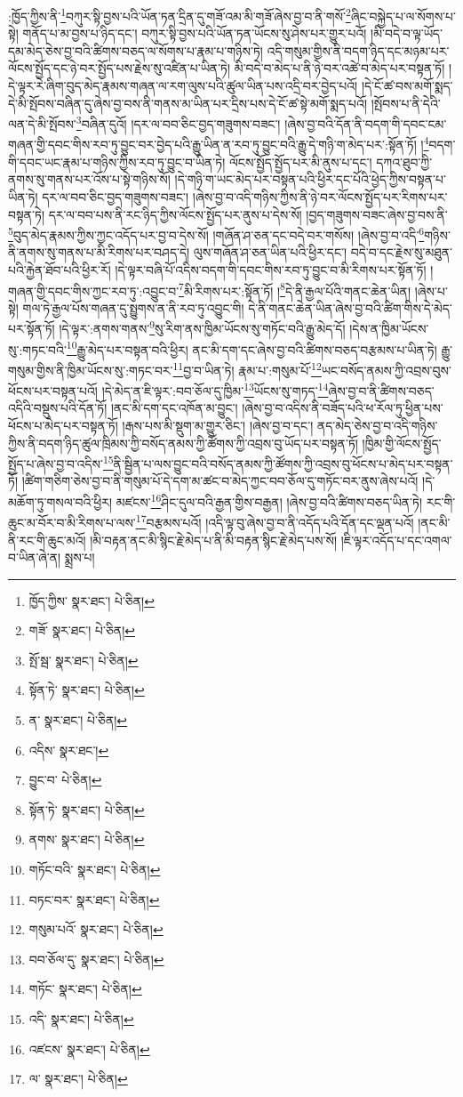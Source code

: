 :ཁྱོད་ཀྱིས་ནི་\footnote{ཁྱོད་ཀྱིས་  སྣར་ཐང་།  པེ་ཅིན། }བཀུར་སྟི་བྱས་པའི་ཡོན་ཏན་དྲིན་དུ་གཟོ་འམ་མི་གཟོ་ཞེས་བྱ་བ་ནི་གསོ་\footnote{གཟོ་  སྣར་ཐང་།  པེ་ཅིན། }ཞིང་བསྐྱེད་པ་ལ་སོགས་པ་སྟེ། གནོད་པ་མ་བྱས་པ་ཉིད་དང་། བཀུར་སྟི་བྱས་པའི་ཡོན་ཏན་ཡོངས་སུ་ཤེས་པར་གྱུར་པའོ། །མི་བདེ་བ་ལྟ་ཡོད་དམ་མེད་ཅེས་བྱ་བའི་ཚིགས་བཅད་ལ་སོགས་པ་རྣམ་པ་གཉིས་ཏེ། འདི་གསུམ་གྱིས་ནི་བདག་ཉིད་དང་མཉམ་པར་ལོངས་སྤྱོད་དང་ཉེ་བར་སྤྱོད་པས་རྗེས་སུ་འཛིན་པ་ཡིན་ཏེ། མི་བདེ་བ་མེད་པ་ནི་ཉེ་བར་འཚེ་བ་མེད་པར་བསྟན་ཏོ། །དེ་ལྟར་རེ་ཞིག་བུད་མེད་རྣམས་གཞན་ལ་རག་ལུས་པའི་ཚུལ་ཡིན་པས་འདྲི་བར་བྱེད་པའོ། །དེ་ངོ་ཚ་བས་མགོ་སྨད་དེ་མི་སྤོབས་བཞིན་དུ་ཞེས་བྱ་བས་ནི་གནས་མ་ཡིན་པར་དྲིས་པས་དེ་ངོ་ཚ་སྟེ་མགོ་སྨད་པའོ། །སྤོབས་པ་ནི་དེའི་ལན་དེ་མི་སྤོབས་\footnote{སྤོ་སྦ་  སྣར་ཐང་།  པེ་ཅིན། }བཞིན་དུའོ། །དར་ལ་བབ་ཅིང་བྱད་གཟུགས་བཟང་། །ཞེས་བྱ་བའི་དོན་ནི་བདག་གི་དབང་ངམ་གཞན་གྱི་དབང་གིས་རབ་ཏུ་བྱུང་བར་བྱེད་པའི་རྒྱུ་ཡིན་ན་རབ་ཏུ་བྱུང་བའི་རྒྱུ་དེ་གཉི་ག་མེད་པར་:སྟོན་ཏོ། །\footnote{སྟོན་ཏེ་  སྣར་ཐང་།  པེ་ཅིན། }བདག་གི་དབང་ཡང་རྣམ་པ་གཉིས་ཀྱིས་རབ་ཏུ་བྱུང་བ་ཡིན་ཏེ། ལོངས་སྤྱོད་སྤྱོད་པར་མི་ནུས་པ་དང་། དཀའ་ཐུབ་ཀྱི་ནགས་སུ་གནས་པར་འོས་པ་སྟེ་གཉིས་སོ། །དེ་གཉི་ག་ཡང་མེད་པར་བསྟན་པའི་ཕྱིར་དང་པོའི་ཕྱེད་ཀྱིས་བསྟན་པ་ཡིན་ཏེ། དར་ལ་བབ་ཅིང་བྱད་གཟུགས་བཟང་། །ཞེས་བྱ་བ་འདི་གཉིས་ཀྱིས་ནི་ཉེ་བར་ལོངས་སྤྱོད་པར་རིགས་པར་བསྟན་ཏེ། དར་ལ་བབ་པས་ནི་རང་ཉིད་ཀྱིས་ལོངས་སྤྱོད་པར་ནུས་པ་དེས་སོ། །བྱད་གཟུགས་བཟང་ཞེས་བྱ་བས་ནི་\footnote{ན་  སྣར་ཐང་།  པེ་ཅིན། }བུད་མེད་རྣམས་ཀྱིས་ཀྱང་འདོད་པར་བྱ་བ་དེས་སོ། །གཞོན་ཤ་ཅན་དང་བདེ་བར་གསོས། །ཞེས་བྱ་བ་འདི་\footnote{འདིས་  སྣར་ཐང་། }གཉིས་ནི་ནགས་སུ་གནས་པ་མི་རིགས་པར་བཤད་དེ། ལུས་གཞོན་ཤ་ཅན་ཡིན་པའི་ཕྱིར་དང་། བདེ་བ་དང་རྗེས་སུ་མཐུན་པའི་རྐྱེན་ཐོབ་པའི་ཕྱིར་རོ། །དེ་ལྟར་བཞི་པོ་འདིས་བདག་གི་དབང་གིས་རབ་ཏུ་བྱུང་བ་མི་རིགས་པར་སྟོན་ཏོ། །གཞན་གྱི་དབང་གིས་ཀྱང་རབ་ཏུ་:འབྱུང་བ་\footnote{བྱུང་བ་  པེ་ཅིན། }མི་རིགས་པར་:སྟོན་ཏོ། །\footnote{སྟོན་ཏེ་  སྣར་ཐང་།  པེ་ཅིན། }དེ་ནི་རྒྱལ་པོའི་གནང་ཆེན་ཡིན། །ཞེས་པ་སྟེ། གལ་ཏེ་རྒྱལ་པོས་གཞན་དུ་སྤྱུགས་ན་ནི་རབ་ཏུ་འབྱུང་གི། དེ་ནི་གནང་ཆེན་ཡིན་ཞེས་བྱ་བའི་ཚིག་གིས་དེ་མེད་པར་སྟོན་ཏོ། །དེ་ལྟར་:ནགས་གནས་\footnote{ནགས་  སྣར་ཐང་།  པེ་ཅིན། }སུ་རིག་ནས་ཁྱིམ་ཡོངས་སུ་གཏོང་བའི་རྒྱུ་མེད་དོ། །དེས་ན་ཁྱིམ་ཡོངས་སུ་:གཏང་བའི་\footnote{གཏོང་བའི་  སྣར་ཐང་།  པེ་ཅིན། }རྒྱུ་མེད་པར་བསྟན་བའི་ཕྱིར། ནང་མི་དག་དང་ཞེས་བྱ་བའི་ཚིགས་བཅད་བརྩམས་པ་ཡིན་ཏེ། རྒྱུ་གསུམ་གྱིས་ནི་ཁྱིམ་ཡོངས་སུ་:གཏང་བར་\footnote{བཏང་བར་  སྣར་ཐང་།  པེ་ཅིན། }བྱ་བ་ཡིན་ཏེ། རྣམ་པ་:གསུམ་པོ་\footnote{གསུམ་པའོ་  སྣར་ཐང་།  པེ་ཅིན། }ཡང་བསོད་ནམས་ཀྱི་འབྲས་བུས་ཕོངས་པར་བསྟན་པའོ། །དེ་མེད་ན་ཇི་ལྟར་:བབ་ཅོལ་དུ་ཁྱིམ་\footnote{བབ་ཅོལ་དུ་  སྣར་ཐང་།  པེ་ཅིན། }ཡོངས་སུ་གཏད་\footnote{གཏོང་  སྣར་ཐང་།  པེ་ཅིན། }ཞེས་བྱ་བ་ནི་ཚིགས་བཅད་འདིའི་བསྡུས་པའི་དོན་ཏོ། །ནང་མི་དག་དང་འཁོན་མ་བྱུང་། །ཞེས་བྱ་བ་འདིས་ནི་བཟོད་པའི་ཕ་རོལ་ཏུ་ཕྱིན་པས་ཕོངས་པ་མེད་པར་བསྟན་ཏོ། །རྒས་པས་མི་སྡུག་མ་གྱུར་ཅིང་། །ཞེས་བྱ་བ་དང་། ནད་མེད་ཅེས་བྱ་བ་འདི་གཉིས་ཀྱིས་ནི་བདག་ཉིད་ཚུལ་ཁྲིམས་ཀྱི་བསོད་ནམས་ཀྱི་ཚོགས་ཀྱི་འབྲས་བུ་ཡོད་པར་བསྟན་ཏོ། །ཁྱིམ་གྱི་ལོངས་སྤྱོད་སྤྱོད་པ་ཞེས་བྱ་བ་འདིས་\footnote{འདི་  སྣར་ཐང་།  པེ་ཅིན། }ནི་སྦྱིན་པ་ལས་བྱུང་བའི་བསོད་ནམས་ཀྱི་ཚོགས་ཀྱི་འབྲས་བུ་ཕོངས་པ་མེད་པར་བསྟན་ཏོ། །ཚིག་གཅིག་ཅེས་བྱ་བ་ནི་གསུམ་པོ་དེ་དག་མ་ཚང་བ་མེད་ཀྱང་བབ་ཅོལ་དུ་གཏོང་བར་ནུས་ཞེས་པའོ། །དེ་མཆོག་ཏུ་གསལ་བའི་ཕྱིར། མཛངས་\footnote{འཛངས་  སྣར་ཐང་།  པེ་ཅིན། }ཤིང་དུལ་བའི་རྒྱན་གྱིས་བརྒྱན། །ཞེས་བྱ་བའི་ཚིགས་བཅད་ཡིན་ཏེ། རང་གི་ཆུང་མ་བོར་བ་མི་རིགས་པ་ལས་\footnote{ལ་  སྣར་ཐང་།  པེ་ཅིན། }བརྩམས་པའོ། །འདི་ལྟ་བུ་ཞེས་བྱ་བ་ནི་འདོད་པའི་དོན་དང་ལྡན་པའོ། །ནང་མི་ནི་རང་གི་ཆུང་མའོ། །མི་བརྟན་ནང་མི་སྙིང་རྗེ་མེད་པ་ནི་མི་བརྟན་སྙིང་རྗེ་མེད་པས་སོ། །ཇི་ལྟར་འདོད་པ་དང་འགལ་བ་ཡིན་ཞེ་ན། སྨྲས་པ། 